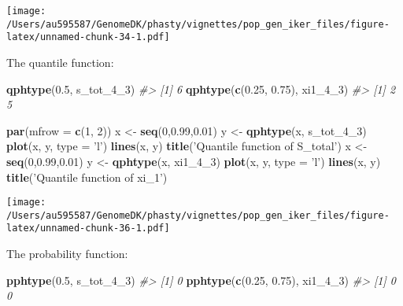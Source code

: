 \documentclass[]{article}
\newenvironment{Shaded}{\begin{snugshade}}{\end{snugshade}}
\newcommand{\CommentTok}[1]{\textcolor[rgb]{0.56,0.35,0.01}{\textit{#1}}}
\newcommand{\DataTypeTok}[1]{\textcolor[rgb]{0.13,0.29,0.53}{#1}}
\newcommand{\DecValTok}[1]{\textcolor[rgb]{0.00,0.00,0.81}{#1}}
\newcommand{\FloatTok}[1]{\textcolor[rgb]{0.00,0.00,0.81}{#1}}
\newcommand{\KeywordTok}[1]{\textcolor[rgb]{0.13,0.29,0.53}{\textbf{#1}}}
\newcommand{\NormalTok}[1]{#1}
\newcommand{\StringTok}[1]{\textcolor[rgb]{0.31,0.60,0.02}{#1}}
\begin{document}
\texttt{[image: /Users/au595587/GenomeDK/phasty/vignettes/pop\_gen\_iker\_files/figure-latex/unnamed-chunk-34-1.pdf]}

The quantile function:

\begin{Shaded}
\begin{Highlighting}[]
\KeywordTok{qphtype}\NormalTok{(}\FloatTok{0.5}\NormalTok{, s_tot_}\DecValTok{4}\NormalTok{_}\DecValTok{3}\NormalTok{)}
\CommentTok{#> [1] 6}
\KeywordTok{qphtype}\NormalTok{(}\KeywordTok{c}\NormalTok{(}\FloatTok{0.25}\NormalTok{, }\FloatTok{0.75}\NormalTok{), xi1_}\DecValTok{4}\NormalTok{_}\DecValTok{3}\NormalTok{)}
\CommentTok{#> [1] 2 5}
\end{Highlighting}
\end{Shaded}

\begin{Shaded}
\begin{Highlighting}[]
\KeywordTok{par}\NormalTok{(}\DataTypeTok{mfrow =} \KeywordTok{c}\NormalTok{(}\DecValTok{1}\NormalTok{, }\DecValTok{2}\NormalTok{))}
\NormalTok{x <-}\StringTok{ }\KeywordTok{seq}\NormalTok{(}\DecValTok{0}\NormalTok{,}\FloatTok{0.99}\NormalTok{,}\FloatTok{0.01}\NormalTok{)}
\NormalTok{y <-}\StringTok{ }\KeywordTok{qphtype}\NormalTok{(x, s_tot_}\DecValTok{4}\NormalTok{_}\DecValTok{3}\NormalTok{)}
\KeywordTok{plot}\NormalTok{(x, y, }\DataTypeTok{type =} \StringTok{'l'}\NormalTok{)}
\KeywordTok{lines}\NormalTok{(x, y)}
\KeywordTok{title}\NormalTok{(}\StringTok{'Quantile function of S_total'}\NormalTok{)}
\NormalTok{x <-}\StringTok{ }\KeywordTok{seq}\NormalTok{(}\DecValTok{0}\NormalTok{,}\FloatTok{0.99}\NormalTok{,}\FloatTok{0.01}\NormalTok{)}
\NormalTok{y <-}\StringTok{ }\KeywordTok{qphtype}\NormalTok{(x, xi1_}\DecValTok{4}\NormalTok{_}\DecValTok{3}\NormalTok{)}
\KeywordTok{plot}\NormalTok{(x, y, }\DataTypeTok{type =} \StringTok{'l'}\NormalTok{)}
\KeywordTok{lines}\NormalTok{(x, y)}
\KeywordTok{title}\NormalTok{(}\StringTok{'Quantile function of xi_1'}\NormalTok{)}
\end{Highlighting}
\end{Shaded}

\texttt{[image: /Users/au595587/GenomeDK/phasty/vignettes/pop\_gen\_iker\_files/figure-latex/unnamed-chunk-36-1.pdf]}

The probability function:

\begin{Shaded}
\begin{Highlighting}[]
\KeywordTok{pphtype}\NormalTok{(}\FloatTok{0.5}\NormalTok{, s_tot_}\DecValTok{4}\NormalTok{_}\DecValTok{3}\NormalTok{)}
\CommentTok{#> [1] 0}
\KeywordTok{pphtype}\NormalTok{(}\KeywordTok{c}\NormalTok{(}\FloatTok{0.25}\NormalTok{, }\FloatTok{0.75}\NormalTok{), xi1_}\DecValTok{4}\NormalTok{_}\DecValTok{3}\NormalTok{)}
\CommentTok{#> [1] 0 0}
\end{Highlighting}
\end{Shaded}
\end{document}
